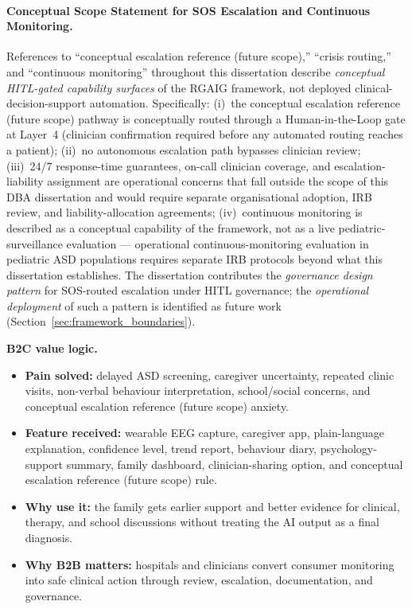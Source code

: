 \paragraph{Conceptual Scope Statement for SOS Escalation and Continuous Monitoring.}
\label{para:sos_scope_statement}
References to ``conceptual escalation reference (future scope),'' ``crisis routing,'' and ``continuous monitoring'' throughout this dissertation describe \textit{conceptual HITL-gated capability surfaces} of the RGAIG framework, not deployed clinical-decision-support automation. Specifically: (i)~the conceptual escalation reference (future scope) pathway is conceptually routed through a Human-in-the-Loop gate at Layer~4 (clinician confirmation required before any automated routing reaches a patient); (ii)~no autonomous escalation path bypasses clinician review; (iii)~24/7 response-time guarantees, on-call clinician coverage, and escalation-liability assignment are operational concerns that fall outside the scope of this DBA dissertation and would require separate organisational adoption, IRB review, and liability-allocation agreements; (iv)~continuous monitoring is described as a conceptual capability of the framework, not as a live pediatric-surveillance evaluation --- operational continuous-monitoring evaluation in pediatric ASD populations requires separate IRB protocols beyond what this dissertation establishes. The dissertation contributes the \emph{governance design pattern} for SOS-routed escalation under HITL governance; the \emph{operational deployment} of such a pattern is identified as future work (Section~\ref{sec:framework_boundaries}).

\noindent\textbf{B2C value logic.}
\begin{itemize}[leftmargin=*, itemsep=2pt]
    \item \textbf{Pain solved:} delayed ASD screening, caregiver uncertainty, repeated clinic visits, non-verbal behaviour interpretation, school/social concerns, and conceptual escalation reference (future scope) anxiety.
    \item \textbf{Feature received:} wearable EEG capture, caregiver app, plain-language explanation, confidence level, trend report, behaviour diary, psychology-support summary, family dashboard, clinician-sharing option, and conceptual escalation reference (future scope) rule.
    \item \textbf{Why use it:} the family gets earlier support and better evidence for clinical, therapy, and school discussions without treating the AI output as a final diagnosis.
    \item \textbf{Why B2B matters:} hospitals and clinicians convert consumer monitoring into safe clinical action through review, escalation, documentation, and governance.
\end{itemize}

